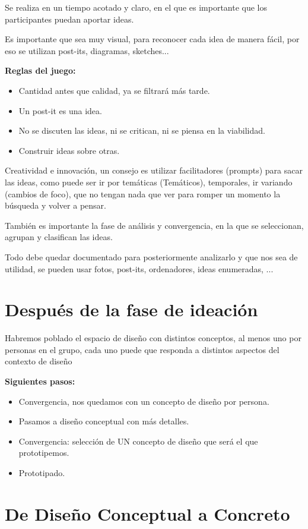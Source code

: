 \documentclass[12pt, twoside, openright]{report} %
\begin{document}
Se realiza en un tiempo acotado y claro, en el que es importante que los participantes puedan aportar ideas.

Es importante que sea muy visual, para reconocer cada idea de manera fácil, por eso se utilizan post-its, diagramas, sketches...

\textbf{Reglas del juego:}
\begin{itemize}
  \item Cantidad antes que calidad, ya se filtrará más tarde.
  \item Un post-it es una idea.
  \item No se discuten las ideas, ni se critican, ni se piensa en la viabilidad.
  \item Construir ideas sobre otras.
\end{itemize}

Creatividad e innovación, un consejo es utilizar facilitadores (prompts) para sacar las ideas, como puede ser ir por temáticas (Temáticos), temporales, ir variando (cambios de foco), que no tengan nada que ver para romper un momento la búsqueda y volver a pensar.

También es importante la fase de análisis y convergencia, en la que se seleccionan, agrupan y clasifican las ideas.

Todo debe quedar documentado para posteriormente analizarlo y que nos sea de utilidad, se pueden usar fotos, post-its, ordenadores, ideas enumeradas, ...

\section{Después de la fase de ideación}

Habremos poblado el espacio de diseño con distintos conceptos, al menos uno por personas en el grupo, cada uno puede que responda a distintos aspectos del contexto de diseño

\textbf{Siguientes pasos:}
\begin{itemize}
  \item Convergencia, nos quedamos con un concepto de diseño por persona.
  \item Pasamos a diseño conceptual con más detalles.
  \item Convergencia: selección de UN concepto de diseño que será el que prototipemos.
  \item Prototipado.
\end{itemize}

\section{De Diseño Conceptual a Concreto}
\end{document}

